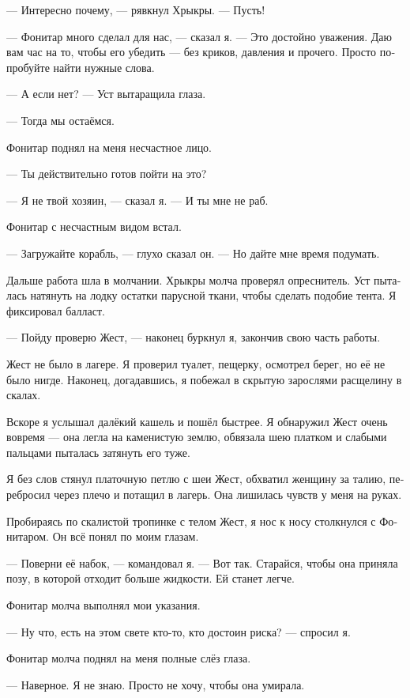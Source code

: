 \documentclass[a4paper,10pt,fleqn]{book}\usepackage{polyglossia}\setdefaultlanguage[babelshorthands=true]{russian}\setotherlanguage{english}\defaultfontfeatures{Ligatures=TeX,Mapping=tex-text}
\newcommand{\asterism}{\vspace{1em}{\centering\Large\bfseries$\ast~\ast~\ast$\par}\vspace{1em}}
\begin{document}
--- Интересно почему, --- рявкнул Хрыкры.
--- Пусть!

--- Фонитар много сделал для нас, --- сказал я.
--- Это достойно уважения.
Даю вам час на то, чтобы его убедить --- без криков, давления и прочего.
Просто попробуйте найти нужные слова.

--- А если нет? --- Уст вытаращила глаза.

--- Тогда мы остаёмся.

Фонитар поднял на меня несчастное лицо.

--- Ты действительно готов пойти на это?

--- Я не твой хозяин, --- сказал я.
--- И ты мне не раб.

Фонитар с несчастным видом встал.

--- Загружайте корабль, --- глухо сказал он.
--- Но дайте мне время подумать.

\asterism

Дальше работа шла в молчании.
Хрыкры молча проверял опреснитель.
Уст пыталась натянуть на лодку остатки парусной ткани, чтобы сделать подобие тента.
Я фиксировал балласт.

--- Пойду проверю Жест, --- наконец буркнул я, закончив свою часть работы.

Жест не было в лагере.
Я проверил туалет, пещерку, осмотрел берег, но её не было нигде.
Наконец, догадавшись, я побежал в скрытую зарослями расщелину в скалах.

Вскоре я услышал далёкий кашель и пошёл быстрее.
Я обнаружил Жест очень вовремя --- она легла на каменистую землю, обвязала шею платком и слабыми пальцами пыталась затянуть его туже.

Я без слов стянул платочную петлю с шеи Жест, обхватил женщину за талию, перебросил через плечо и потащил в лагерь.
Она лишилась чувств у меня на руках.

Пробираясь по скалистой тропинке с телом Жест, я нос к носу столкнулся с Фонитаром.
Он всё понял по моим глазам.

\asterism

--- Поверни её набок, --- командовал я.
--- Вот так.
Старайся, чтобы она приняла позу, в которой отходит больше жидкости.
Ей станет легче.

Фонитар молча выполнял мои указания.

--- Ну что, есть на этом свете кто-то, кто достоин риска? --- спросил я.

Фонитар молча поднял на меня полные слёз глаза.

--- Наверное.
Я не знаю.
Просто не хочу, чтобы она умирала.
\end{document}
